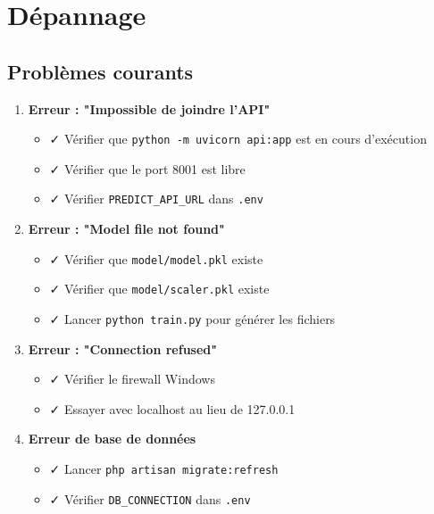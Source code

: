 \documentclass[12pt,a4paper]{article}
\begin{document}
\newpage

\section{Dépannage}

\subsection{Problèmes courants}

\begin{enumerate}
    \item \textbf{Erreur : "Impossible de joindre l'API"}
    \begin{itemize}
        \item ✓ Vérifier que \texttt{python -m uvicorn api:app} est en cours d'exécution
        \item ✓ Vérifier que le port 8001 est libre
        \item ✓ Vérifier \texttt{PREDICT\_API\_URL} dans \texttt{.env}
    \end{itemize}
    
    \item \textbf{Erreur : "Model file not found"}
    \begin{itemize}
        \item ✓ Vérifier que \texttt{model/model.pkl} existe
        \item ✓ Vérifier que \texttt{model/scaler.pkl} existe
        \item ✓ Lancer \texttt{python train.py} pour générer les fichiers
    \end{itemize}
    
    \item \textbf{Erreur : "Connection refused"}
    \begin{itemize}
        \item ✓ Vérifier le firewall Windows
        \item ✓ Essayer avec localhost au lieu de 127.0.0.1
    \end{itemize}
    
    \item \textbf{Erreur de base de données}
    \begin{itemize}
        \item ✓ Lancer \texttt{php artisan migrate:refresh}
        \item ✓ Vérifier \texttt{DB\_CONNECTION} dans \texttt{.env}
    \end{itemize}
\end{enumerate}
\end{document}
